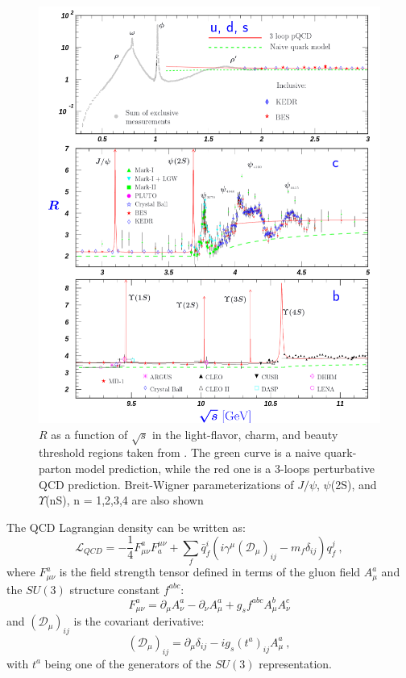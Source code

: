 \begin{figure}[p]
    \centering
    \includegraphics[width=\linewidth]{Figures/Chapter 1/rpp2022-R_udscb.pdf}
    \caption{$R$ as a function of $\sqrt{s}$ in the light-flavor, charm, and beauty threshold regions taken from \cite{pdg}. The green curve is a naive quark-parton model prediction, while the red one is a 3-loops perturbative QCD prediction. Breit-Wigner parameterizations of $J/\psi$, $\psi$(2S), and $\Upsilon$(nS), n = 1,2,3,4 are also shown}
    \label{fig:R_vs_s}
\end{figure}

The QCD Lagrangian density can be written as:
\begin{equation}\label{eq:Lqcd}
    \mathcal{L}_{QCD}=-\frac{1}{4} F^a_{\mu\nu}F_a^{\mu\nu} + \sum_f \bar{q}_f^i (i\gamma^\mu(\mathcal{D}_\mu)_{ij}-m_f\delta_{ij})q_f^j\ ,
\end{equation}
where $F^a_{\mu\nu}$ is the field strength tensor defined in terms of the gluon field $A^a_\mu$ and the $SU(3)$ structure constant $f^{abc}$:
\begin{equation} \label{eq:F}
    F^a_{\mu\nu} = \partial_\mu A^a_\nu - \partial_\nu A^a_\mu + g_s f^{abc}A^b_\mu A^c_\nu 
\end{equation}
and $(\mathcal{D}_\mu)_{ij}$ is the covariant derivative:
\begin{equation*}
    (\mathcal{D}_\mu)_{ij} = \partial_\mu \delta_{ij} - ig_s(t^a)_{ij}A_\mu^a\ ,
\end{equation*}
with $t^a$ being one of the generators of the $SU(3)$ representation.

